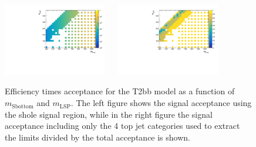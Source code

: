 \begin{figure}[h!]
  \begin{center}
    \includegraphics[width=0.4\textwidth]{figures/jetRanking/T2bb/eff/T2bb_merging_9_cats.pdf} ~~
    \includegraphics[width=0.4\textwidth]{figures/susyResults/T2bb_doubleRatioAcceptance.pdf} \\
    \caption{
      Efficiency times acceptance for the T2bb model as a function of $m_{\mathrm{Sbottom}}$ and $m_{\mathrm{LSP}}$.
      The left figure shows the signal acceptance using the shole signal region, 
      while in the right figure the signal acceptance including only the 4 top jet categories used to extract the limits divided by the total acceptance is shown.
    }
    \label{fig:sig-eff-T2bb}
  \end{center}
\end{figure}

